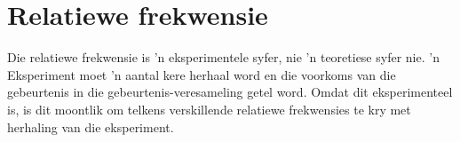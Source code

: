 \section{Relatiewe frekwensie}


Die relatiewe frekwensie is 'n eksperimentele syfer, nie 'n teoretiese syfer nie. 'n Eksperiment moet 'n aantal kere herhaal word en die voorkoms van die gebeurtenis in die gebeurtenis-veresameling getel word. Omdat dit eksperimenteel is, is dit moontlik om telkens verskillende relatiewe frekwensies te kry met herhaling van die eksperiment.\par


